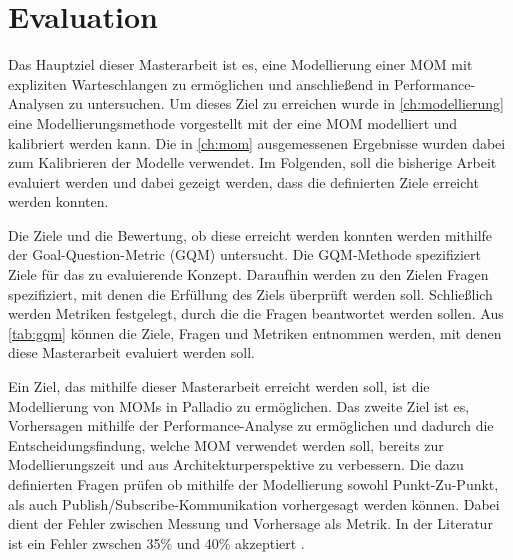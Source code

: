
\chapter{Evaluation}
\label{ch:Evaluation}
Das Hauptziel dieser Masterarbeit ist es, eine Modellierung einer MOM mit expliziten Warteschlangen zu ermöglichen und anschließend in Performance-Analysen zu untersuchen. Um dieses Ziel zu erreichen wurde in \autoref{ch:modellierung} eine Modellierungsmethode vorgestellt mit der eine MOM modelliert und kalibriert werden kann. Die in \autoref{ch:mom} ausgemessenen Ergebnisse wurden dabei zum Kalibrieren der Modelle verwendet. Im Folgenden, soll die bisherige Arbeit evaluiert werden und dabei gezeigt werden, dass die definierten Ziele erreicht werden konnten. 

Die Ziele und die Bewertung, ob diese erreicht werden konnten werden mithilfe der Goal-Question-Metric (GQM) untersucht.
Die GQM-Methode \cite{gqm} spezifiziert Ziele für das zu evaluierende Konzept. Daraufhin werden zu den Zielen Fragen spezifiziert, mit denen die Erfüllung des Ziels überprüft werden soll. Schließlich werden Metriken festgelegt, durch die die Fragen beantwortet werden sollen. Aus \autoref{tab:gqm} können die Ziele, Fragen und Metriken entnommen werden, mit denen diese Masterarbeit evaluiert werden soll.

Ein Ziel, das mithilfe dieser Masterarbeit erreicht werden soll, ist die Modellierung von MOMs in Palladio zu ermöglichen. Das zweite Ziel ist es, Vorhersagen mithilfe der Performance-Analyse zu ermöglichen und dadurch die Entscheidungsfindung, welche MOM verwendet werden soll, bereits zur Modellierungszeit und aus Architekturperspektive zu verbessern. Die dazu definierten Fragen prüfen ob mithilfe der Modellierung sowohl Punkt-Zu-Punkt, als auch Publish/Subscribe-Kommunikation vorhergesagt werden können. Dabei dient der Fehler zwischen Messung und Vorhersage als Metrik. In der Literatur ist ein Fehler zwschen 35\% und 40\% akzeptiert \cite{error}.

